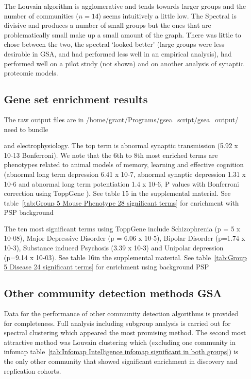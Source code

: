 The Louvain algorithm is agglomerative and tends towards larger groups and the number of communities ($n=14$) seems intuitively a little low. The Spectral is divisive and produces a number of small groups but the ones that are problematically small make up a small amount of the graph. There was little to chose between the two, the spectral `looked better' (large groups were less desirable in GSA\cite{de2016statistical}, and had performed less well in an empirical analysis\cite{leskovec2010empirical}), had performed well on a pilot study (not shown) and on another analysis of synaptic proteomic models\cite{mclean2016improved}. 


\subsection{Gene set enrichment results}

The raw output files are in \url{/home/grant/Programs/gsea_script/gsea_output/} need to bundle



and electrophysiology. The top term is abnormal synaptic transmission (5.92 x 10-13 Bonferroni). We note that the 6th to 8th most enriched terms are phenotypes related to animal models of memory, learning and effective cognition (abnormal long term depression 6.41 x 10-7, abnormal synaptic depression 1.31 x 10-6 and abnormal long term potentiation 1.4 x 10-6, P values with Bonferroni correction using ToppGene \cite{chen2009toppgene} ). See table 15 in the supplemental material. See table~\ref{tab:Group 5 Mouse Phenotype 28 significant terms} for enrichment with PSP background


The ten most significant terms using ToppGene \cite{chen2009toppgene}  include Schizophrenia (p = 5 x 10-08), Major Depressive Disorder (p = 6.06 x 10-5),  Bipolar Disorder (p=1.74 x 10-3), Substance induced Psychosis  (3.39 x 10-3) and Unipolar depression (p=9.14 x 10-03). See table 16in the supplemental material. See table~\ref{tab:Group 5 Disease 24 significant terms} for enrichment using background PSP


\subsection{Other community detection methods GSA}


Data for the performance of other community detection algorithms is provided for completeness. Full analysis including subgroup analysis is carried out for spectral clustering which appeared the most promising method. The second most attractive method was Louvain clustering which (excluding one community in infomap table~\ref{tab:Infomap Intelligence infomap significant in both groups}) is the only other community that showed significant enrichment in discovery and replication cohorts. 


